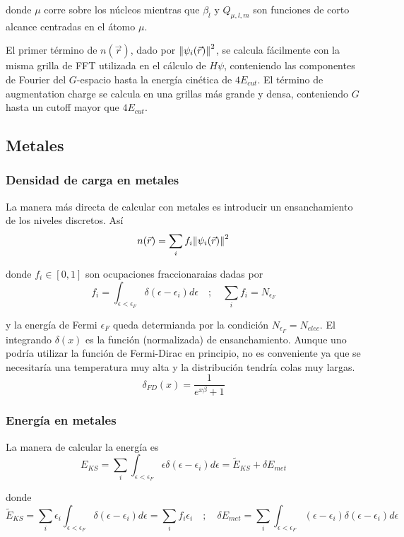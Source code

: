   donde $\mu$ corre sobre los núcleos mientras que $\beta_l$ y $Q_{\mu,l,m}$ son funciones de corto alcance centradas en el átomo $\mu$.

  El primer término de $n (\vec{r})$, dado por $\norm{\psi_i (\vec{r})}^2$, se calcula fácilmente con la misma grilla de FFT utilizada en el cálculo de $H\psi$, conteniendo las componentes de Fourier del $G$-espacio hasta la energía cinética de $4E_{cut}$. El término de augmentation charge se calcula en una grillas más grande y densa, conteniendo $G$ hasta un cutoff mayor que $4E_{cut}$.

\subsection{Metales}

\subsubsection{Densidad de carga en metales}

  La manera más directa de calcular con metales es introducir un ensanchamiento de los niveles discretos. Así
    $$n(\vec{r}) = \sum_i f_i \norm{\psi_i (\vec{r})}^2 $$

  donde $f_i\in [0,1]$ son ocupaciones fraccionaraias dadas por
    $$f_i = \int_{\epsilon < \epsilon_F} \delta (\epsilon - \epsilon_i) d \epsilon \quad ; \quad \sum_i f_i = N_{\epsilon_F}$$

  y la energía de Fermi $\epsilon_F$ queda determianda por la condición $N_{\epsilon_F}  = N_{elec}$. El integrando $\delta(x)$ es la función (normalizada) de ensanchamiento. Aunque uno podría utilizar la función de Fermi-Dirac en principio, no es conveniente ya que se necesitaría una temperatura muy alta y la distribución tendría colas muy largas.
    $$\delta_{FD} (x) = \frac{1}{e^{x\beta} + 1}$$

\subsubsection{Energía en metales}

  La manera de calcular la energía es
    $$E_{KS} = \sum_i \int_{\epsilon < \epsilon_F} \epsilon \delta (\epsilon - \epsilon_i) d \epsilon = \tilde{E}_{KS} + \delta E_{met}$$

  donde
    $$\tilde{E}_{KS} = \sum_i \epsilon_i \int_{\epsilon < \epsilon_F}  \delta (\epsilon - \epsilon_i) d \epsilon = \sum_i f_i \epsilon_i
    \quad ; \quad
    \delta E_{met} = \sum_i \int_{\epsilon < \epsilon_F} (\epsilon - \epsilon_i) \delta (\epsilon - \epsilon_i) d \epsilon$$

